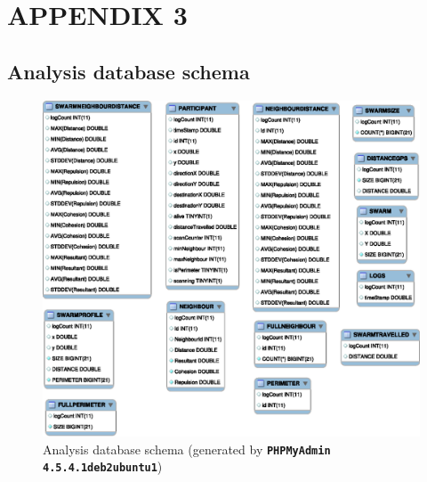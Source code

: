 \chapter{APPENDIX 3}\label{app3}

\section{Analysis database schema}
\begin{figure}[H]
\begin{center}
\includegraphics[width=12cm]{APPENDIX-3/figures/schema}
\end{center}
\caption[Analysis database schema]{Analysis database schema \scriptsize{(generated by \texttt{\textbf{PHPMyAdmin 4.5.4.1deb2ubuntu1}})}\label{app3:schema}}
\end{figure}




